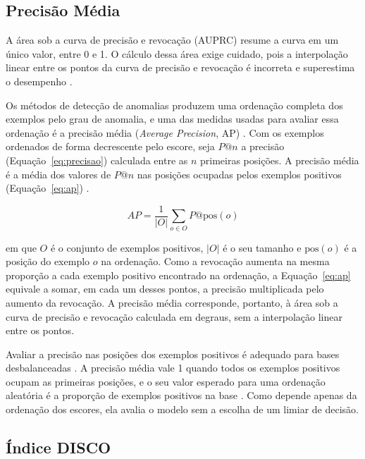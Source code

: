 \documentclass{uflamon}          %
\begin{document}
\subsection{Precisão Média}
\label{sec:ap}

A área sob a curva de precisão e revocação (AUPRC) resume a curva em um único valor, entre 0 e 1. O cálculo dessa área exige cuidado, pois a interpolação linear entre os pontos da curva de precisão e revocação é incorreta e superestima o desempenho \cite{davis2006}.

Os métodos de detecção de anomalias produzem uma ordenação completa dos exemplos pelo grau de anomalia, e uma das medidas usadas para avaliar essa ordenação é a precisão média (\textit{Average Precision}, AP) \cite{campos2016}. Com os exemplos ordenados de forma decrescente pelo escore, seja $P@n$ a precisão (Equação~\ref{eq:precisao}) calculada entre as $n$ primeiras posições. A precisão média é a média dos valores de $P@n$ nas posições ocupadas pelos exemplos positivos (Equação~\ref{eq:ap}) \cite{zhang2009}.

\begin{equation}
    AP = \frac{1}{|O|} \sum_{o \in O} P@\text{pos}(o)
    \label{eq:ap}
\end{equation}

em que $O$ é o conjunto de exemplos positivos, $|O|$ é o seu tamanho e $\text{pos}(o)$ é a posição do exemplo $o$ na ordenação. Como a revocação aumenta na mesma proporção a cada exemplo positivo encontrado na ordenação, a Equação~\ref{eq:ap} equivale a somar, em cada um desses pontos, a precisão multiplicada pelo aumento da revocação. A precisão média corresponde, portanto, à área sob a curva de precisão e revocação calculada em degraus, sem a interpolação linear entre os pontos.

Avaliar a precisão nas posições dos exemplos positivos é adequado para bases desbalanceadas \cite{campos2016}. A precisão média vale 1 quando todos os exemplos positivos ocupam as primeiras posições, e o seu valor esperado para uma ordenação aleatória é a proporção de exemplos positivos na base \cite{campos2016}. Como depende apenas da ordenação dos escores, ela avalia o modelo sem a escolha de um limiar de decisão.

\subsection{Índice DISCO}
\label{sec:disco}
\end{document}
